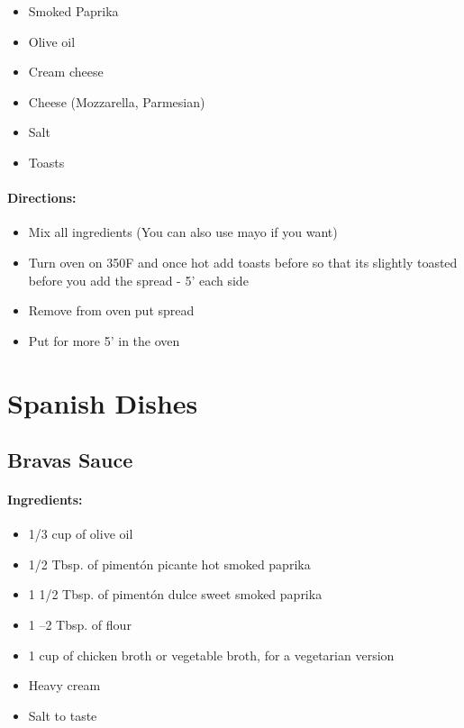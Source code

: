 \documentclass{article}
\begin{document}
\begin{itemize}
	\item Smoked Paprika
	\item Olive oil
	\item Cream cheese
	\item Cheese (Mozzarella, Parmesian)
	\item Salt
	\item Toasts
\end{itemize}

\paragraph{Directions:}
\begin{itemize}
	\item Mix all ingredients (You can also use mayo if you want)
	\item Turn oven on 350F and once hot add toasts before so that its slightly toasted before you add the spread - 5' each side
	\item Remove from oven put spread
	\item Put for more 5' in the oven
\end{itemize}


\section{Spanish Dishes}


\subsection{Bravas Sauce}

\paragraph{Ingredients:}

\begin{itemize}
	\item 1/3 cup of olive oil
	\item 1/2 Tbsp. of pimentón picante hot smoked paprika
	\item 1 1/2 Tbsp. of pimentón dulce sweet smoked paprika
	\item 1 –2 Tbsp. of flour
	\item 1 cup of chicken broth or vegetable broth, for a vegetarian version
	\item Heavy cream
	\item Salt to taste
\end{itemize}
\end{document}
